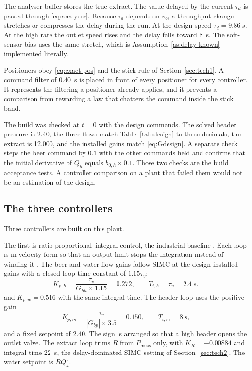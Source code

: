 The analyser buffer stores the true extract. The value delayed by the current $\tau_d$ is passed through \eqref{eq:analyser}. Because $\tau_d$ depends on $v_b$, a throughput change stretches or compresses the delay during the run. At the design speed $\tau_d=\SI{9.86}{s}$. At the high rate the outlet speed rises and the delay falls toward \SI{8}{s}. The soft-sensor bias uses the same stretch, which is Assumption~\ref{as:delay-known} implemented literally.

Positioners obey \eqref{eq:exact-pos} and the stick rule of Section~\ref{sec:tech1}. A command filter of \SI{0.40}{s} is placed in front of every positioner for every controller. It represents the filtering a positioner already applies, and it prevents a comparison from rewarding a law that chatters the command inside the stick band.

The build was checked at $t=0$ with the design commands. The solved header pressure is \SI{2.40}{\barg}, the three flows match Table~\ref{tab:design} to three decimals, the extract is \SI{12.000}{\plato}, and the installed gains match \eqref{eq:Gdesign}. A separate check steps the beer command by $0.1$ with the other commands held and confirms that the initial derivative of $Q_h$ equals $b_{0,h}\times 0.1$. Those two checks are the build acceptance tests. A controller comparison on a plant that failed them would not be an estimation of the design.

\subsection{The three controllers}

Three controllers are built on this plant.

The first is ratio proportional--integral control, the industrial baseline \cite{shinskey1996process,skogestad2003simc,seborg2016process}. Each loop is in velocity form so that an output limit stops the integration instead of winding it \cite{astrom2006advanced}. The beer and water flow gains follow SIMC at the design installed gains with a closed-loop time constant of $1.15\tau_v$:
\begin{equation}
K_{p,h} = \frac{\tau_v}{G_{hh}\times 1.15} = 0.272, \qquad T_{i,h} = \tau_v = \SI{2.4}{s},
\end{equation}
and $K_{p,w} = 0.516$ with the same integral time. The header loop uses the positive gain
\begin{equation}
K_{p,m} = \frac{\tau_v}{|G_{bp}|\times 3.5} = 0.150, \qquad T_{i,m} = \SI{8}{s},
\end{equation}
and a fixed setpoint of \SI{2.40}{\barg}. The sign is arranged so that a high header opens the outlet valve. The extract loop trims $R$ from $P_{\mathrm{meas}}$ only, with $K_R = -0.00884$ and integral time \SI{22}{s}, the delay-dominated SIMC setting of Section~\ref{sec:tech2}. The water setpoint is $R Q_h^\star$.

